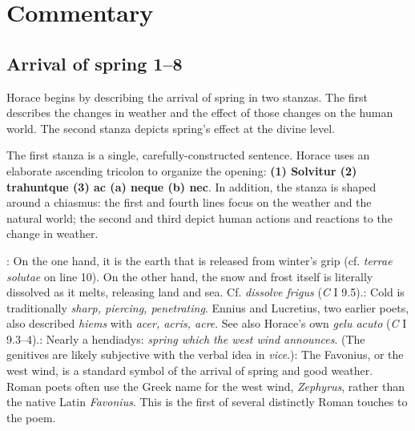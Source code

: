 \chapter*{Commentary}

\section*{Arrival of spring 1--8}

Horace begins by describing the arrival of spring in two stanzas.  The first describes the changes in weather and the effect of those changes on the human world.  The second stanza depicts spring's effect at the divine level.


The first stanza is a single, carefully-constructed sentence.  Horace uses an elaborate ascending tricolon to organize the opening: \textbf{(1) Solvitur \lips (2) trahuntque \lips (3) ac (a) neque \lips (b) nec}.  In addition, the stanza is shaped around a chiasmus: the first and fourth lines focus on the weather and the natural world; the second and third depict human actions and reactions to the change in weather. 


: On the one hand, it is the earth that is released from winter's grip (cf. \textit{terrae \lips solutae} on line 10).  On the other hand, the snow and frost itself is literally dissolved as it melts, releasing land and sea. Cf. \textit{dissolve frigus} (\textit{C} I 9.5).\indent{}: Cold is traditionally \textit{sharp, piercing, penetrating}.  Ennius and Lucretius, two earlier poets, also described \textit{hiems} with \textit{acer, acris, acre}. See also Horace's own \textit{gelu \lips acuto} (\textit{C} I 9.3--4).\indent{}: Nearly a hendiadys: \textit{spring which the west wind announces}.  (The genitives are likely subjective with the verbal idea in \textit{vice}.)\indent{}: The Favonius, or the west wind, is a standard symbol of the arrival of spring and good weather.  Roman poets often use the Greek name for the west wind, \textit{Zephyrus}, rather than the native Latin \textit{Favonius}.  This is the first of several distinctly Roman touches to the poem.
